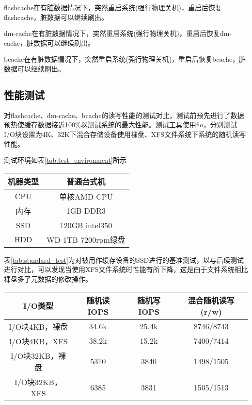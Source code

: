 flashcache在有脏数据情况下，突然重启系统(强行物理关机)，重启后恢复flashcache，脏数据可以继续刷出。

dm-cache在有脏数据情况下，突然重启系统(强行物理关机)，重启后恢复dm-cache，脏数据可以继续刷出。 

bcache在有脏数据情况下，突然重启系统(强行物理关机)，重启后恢复bcache，脏数据可以继续刷出。

\subsection{性能测试}
      
对flashcache、dm-cache、bcache的读写性能的测试对比，测试前预先进行了数据预热使缓存数据接近100\%以测试系统的最大性能。测试工具使用fio，分别测试I/O块设置为4K、32K下混合存储设备使用裸盘、XFS文件系统下系统的随机读写性能。 

测试环境如表\ref{tab:test_environment}所示

\begin{table}[H]
    \centering
    \begin{tabular}{cc} \toprule
      机器类型 & 普通台式机 \\ \midrule
      CPU & 单核AMD CPU\\
      内存 & 1GB DDR3\\
      SSD & 120GB intel350 \\
      HDD & WD 1TB 7200rpm绿盘\\
      \bottomrule
    \end{tabular}
\end{table}

表\ref{tab:standard_test}为对被用作缓存设备的SSD进行的基准测试，以与后续测试进行对比，可以发现当使用XFS文件系统时性能有所下降，这是由于文件系统相比裸盘多了元数据的修改操作。

\begin{table}[H]
    \centering
    \begin{tabular}{cccc} 
      \toprule
      I/O类型 & 随机读IOPS & 随机写IOPS & 混合随机读写(r/w) \\ 
      \midrule
      I/O块4KB，裸盘 & 34.6k & 25.4k & 8746/8743 \\
      I/O块4KB，XFS & 38.2k & 15.2k & 7400/7414 \\
      I/O块32KB，裸盘 & 5310 & 3840 & 1498/1505 \\
      I/O块32KB，XFS & 6385 & 3831 & 1505/1513 \\
      \bottomrule
    \end{tabular}
\end{table}

